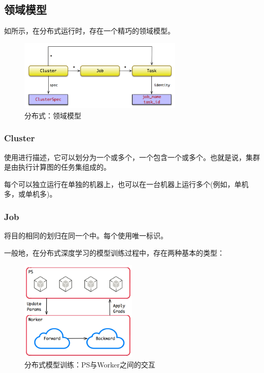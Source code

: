 \begin{content}
\subsection{领域模型}

如所示，在\tf{}分布式运行时，存在一个精巧的领域模型。

\begin{figure}[H]
\centering
\includegraphics[width=0.7\textwidth]{figures/cc-dist-model.png}
\caption{分布式：领域模型}
 \label{fig:cc-dist-model}
\end{figure}

\subsubsection{Cluster}

使用进行描述，它可以划分为一个或多个，一个包含一个或多个。也就是说，集群是由执行计算图的任务集组成的。

每个可以独立运行在单独的机器上，也可以在一台机器上运行多个(例如，单机多，或单机多)。

\subsubsection{Job}

将目的相同的划归在同一个中。每个使用唯一标识。

一般地，在分布式深度学习的模型训练过程中，存在两种基本的类型：

\begin{enum}
\end{enum}

\begin{figure}[H]
\centering
\includegraphics[width=0.5\textwidth]{figures/py-dist-ps-worker.png}
\caption{分布式模型训练：PS与Worker之间的交互}
 \label{fig:py-dist-ps-worker}
\end{figure}


\end{content}
